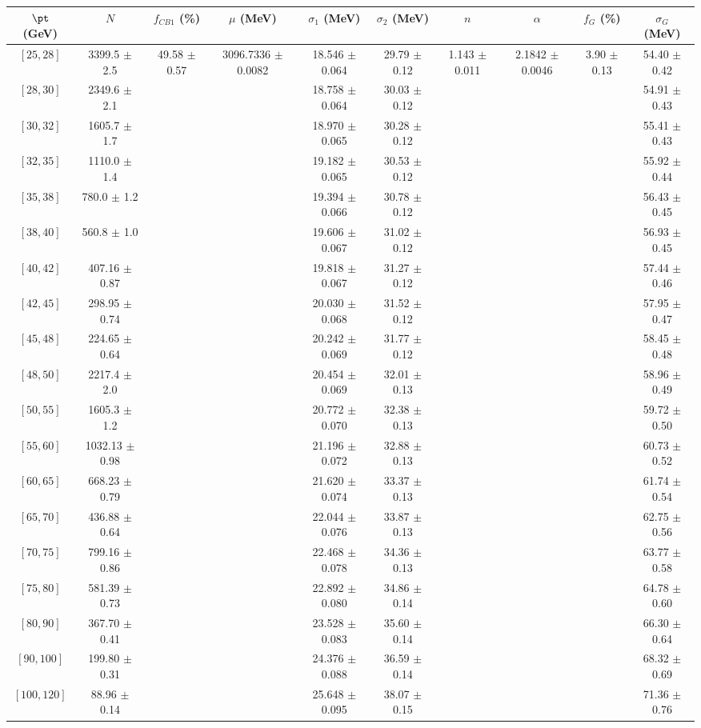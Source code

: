 \begin{tabular}{c||c|c|c|c|c|c|c|c|c}
$\pt$ (GeV) & $N$ & $f_{CB1}$ (\%)  & $\mu$ (MeV) & $\sigma_1$ (MeV) & $\sigma_2$ (MeV) & $n$ & $\alpha$ & $f_G$ (\%) & $\sigma_G$ (MeV) \\
\hline
$[25, 28]$ & 3399.5 $\pm$ 2.5 & \multirow{19}{*}{49.58 $\pm$ 0.57} & \multirow{19}{*}{3096.7336 $\pm$ 0.0082} & 18.546 $\pm$ 0.064 & 29.79 $\pm$ 0.12 & \multirow{19}{*}{1.143 $\pm$ 0.011} & \multirow{19}{*}{2.1842 $\pm$ 0.0046} & \multirow{19}{*}{3.90 $\pm$ 0.13} & 54.40 $\pm$ 0.42\\
$[28, 30]$ & 2349.6 $\pm$ 2.1 &  &  & 18.758 $\pm$ 0.064 & 30.03 $\pm$ 0.12 &  &  &  & 54.91 $\pm$ 0.43\\
$[30, 32]$ & 1605.7 $\pm$ 1.7 &  &  & 18.970 $\pm$ 0.065 & 30.28 $\pm$ 0.12 &  &  &  & 55.41 $\pm$ 0.43\\
$[32, 35]$ & 1110.0 $\pm$ 1.4 &  &  & 19.182 $\pm$ 0.065 & 30.53 $\pm$ 0.12 &  &  &  & 55.92 $\pm$ 0.44\\
$[35, 38]$ & 780.0 $\pm$ 1.2 &  &  & 19.394 $\pm$ 0.066 & 30.78 $\pm$ 0.12 &  &  &  & 56.43 $\pm$ 0.45\\
$[38, 40]$ & 560.8 $\pm$ 1.0 &  &  & 19.606 $\pm$ 0.067 & 31.02 $\pm$ 0.12 &  &  &  & 56.93 $\pm$ 0.45\\
$[40, 42]$ & 407.16 $\pm$ 0.87 &  &  & 19.818 $\pm$ 0.067 & 31.27 $\pm$ 0.12 &  &  &  & 57.44 $\pm$ 0.46\\
$[42, 45]$ & 298.95 $\pm$ 0.74 &  &  & 20.030 $\pm$ 0.068 & 31.52 $\pm$ 0.12 &  &  &  & 57.95 $\pm$ 0.47\\
$[45, 48]$ & 224.65 $\pm$ 0.64 &  &  & 20.242 $\pm$ 0.069 & 31.77 $\pm$ 0.12 &  &  &  & 58.45 $\pm$ 0.48\\
$[48, 50]$ & 2217.4 $\pm$ 2.0 &  &  & 20.454 $\pm$ 0.069 & 32.01 $\pm$ 0.13 &  &  &  & 58.96 $\pm$ 0.49\\
$[50, 55]$ & 1605.3 $\pm$ 1.2 &  &  & 20.772 $\pm$ 0.070 & 32.38 $\pm$ 0.13 &  &  &  & 59.72 $\pm$ 0.50\\
$[55, 60]$ & 1032.13 $\pm$ 0.98 &  &  & 21.196 $\pm$ 0.072 & 32.88 $\pm$ 0.13 &  &  &  & 60.73 $\pm$ 0.52\\
$[60, 65]$ & 668.23 $\pm$ 0.79 &  &  & 21.620 $\pm$ 0.074 & 33.37 $\pm$ 0.13 &  &  &  & 61.74 $\pm$ 0.54\\
$[65, 70]$ & 436.88 $\pm$ 0.64 &  &  & 22.044 $\pm$ 0.076 & 33.87 $\pm$ 0.13 &  &  &  & 62.75 $\pm$ 0.56\\
$[70, 75]$ & 799.16 $\pm$ 0.86 &  &  & 22.468 $\pm$ 0.078 & 34.36 $\pm$ 0.13 &  &  &  & 63.77 $\pm$ 0.58\\
$[75, 80]$ & 581.39 $\pm$ 0.73 &  &  & 22.892 $\pm$ 0.080 & 34.86 $\pm$ 0.14 &  &  &  & 64.78 $\pm$ 0.60\\
$[80, 90]$ & 367.70 $\pm$ 0.41 &  &  & 23.528 $\pm$ 0.083 & 35.60 $\pm$ 0.14 &  &  &  & 66.30 $\pm$ 0.64\\
$[90, 100]$ & 199.80 $\pm$ 0.31 &  &  & 24.376 $\pm$ 0.088 & 36.59 $\pm$ 0.14 &  &  &  & 68.32 $\pm$ 0.69\\
$[100, 120]$ & 88.96 $\pm$ 0.14 &  &  & 25.648 $\pm$ 0.095 & 38.07 $\pm$ 0.15 &  &  &  & 71.36 $\pm$ 0.76\\
\end{tabular}
